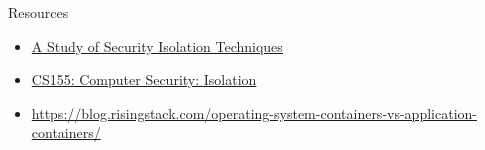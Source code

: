 \documentclass{curs}
\begin{document}
\begin{frame}{Resources}
  \begin{itemize}
    \item \href{https://dl.acm.org/citation.cfm?id=2988545}{A Study of Security Isolation Techniques}
    \item \href{https://crypto.stanford.edu/cs155/lectures/03-isolation.pdf}{CS155: Computer Security: Isolation}
    \item \url{https://blog.risingstack.com/operating-system-containers-vs-application-containers/}
  \end{itemize}
\end{frame}
\end{document}
